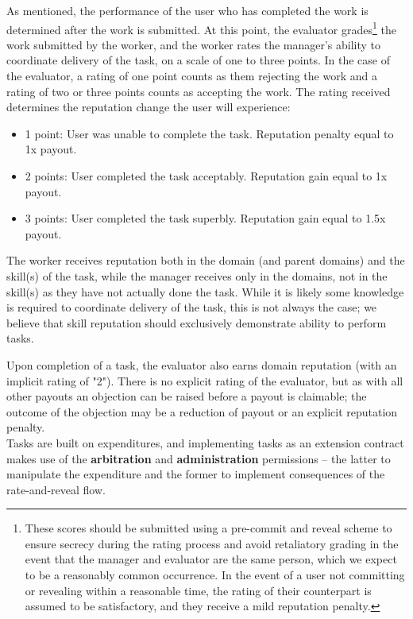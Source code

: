 As mentioned, the performance of the user who has completed the work is determined after the work is submitted. At this point, the evaluator grades\footnote{These scores should be submitted using a pre-commit and reveal scheme to ensure secrecy during the rating process and avoid retaliatory grading in the event that the manager and evaluator are the same person, which we expect to be a reasonably common occurrence. In the event of a user not committing or revealing within a reasonable time, the rating of their counterpart is assumed to be satisfactory, and they receive a mild reputation penalty.} the work submitted by the worker, and the worker rates the manager's ability to coordinate delivery of the task, on a scale of one to three points. In the case of the evaluator, a rating of one point counts as them rejecting the work and a rating of two or three points counts as accepting the work. The rating received determines the reputation change the user will experience:

\begin{itemize}
 \item[]1 point:\phantom{s} User was unable to complete the task. Reputation penalty equal to 1x payout.
 \item[]2 points: User completed the task acceptably. Reputation gain equal to 1x payout.
 \item[]3 points: User completed the task superbly. Reputation gain equal to 1.5x payout.
\end{itemize}

The worker receives reputation both in the domain (and parent domains) and the skill(s) of the task, while the manager receives only in the domains, not in the skill(s) as they have not actually done the task. While it is likely some knowledge is required to coordinate delivery of the task, this is not always the case; we believe that skill reputation should exclusively demonstrate ability to perform tasks.

Upon completion of a task, the evaluator also earns domain reputation (with an implicit rating of "2"). There is no explicit rating of the evaluator, but as with all other payouts an objection can be raised before a payout is claimable; the outcome of the objection may be a reduction of payout or an explicit reputation penalty. \\

Tasks are built on expenditures, and implementing tasks as an extension contract makes use of the \textbf{arbitration} and \textbf{administration} permissions -- the latter to manipulate the expenditure and the former to implement consequences of the rate-and-reveal flow.

